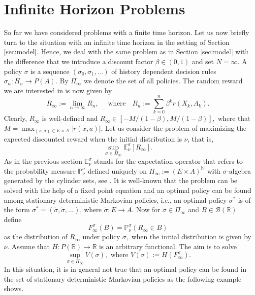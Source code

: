 \documentclass[reqno, 12pt]{amsart}%
\newcommand{\R}{\mathbb{R}} %
\newcommand{\N}{\mathbb{N}} %
\newcommand{\PP}{\mathbb{P}}
\newcommand{\EE}{\mathbb{E}}
\theoremstyle{definition}
\numberwithin{equation}{section} \numberwithin{theorem}{section}
\begin{document}
\section{Infinite Horizon Problems}\label{sec:infi}
So far we have considered problems with a finite time horizon. Let us now briefly turn to the situation with an infinite time horizon in the setting of Section 
\ref{sec:model}. 
Hence, we deal with the same problem as in Section \ref{sec:model} with the difference that we introduce a discount factor $\beta\in(0,1)$
and set $N=\infty.$ A policy $\sigma$ is a sequence 
$(\sigma_0,\sigma_1,\ldots)$ of history dependent decision rules 
$\sigma_n : H_n \to P(A)$. By $\Pi_\infty$ we denote the set of all policies.  The random reward we are interested in is now given by
$$ R_\infty := \lim_{n\to\infty} R_n,\quad \mbox{ where}\quad R_n :=\sum_{k=0}^n \beta^k r(X_k,A_k).$$
Clearly, $R_\infty$ is well-defined and $R_\infty\in[-M/(1-\beta),M/(1-\beta)],$  where  that $M=\max_{(x,a)\in E\times A}|r(x,a)|$.
Let us consider the problem of 
maximizing the expected discounted reward when the 
initial distribution is $\nu$, that is, 
$$ \sup_{\sigma\in \Pi_\infty} \EE_{\nu}^\sigma[R_\infty].$$
As in the previous section $\EE_{\nu}^\sigma$ stands
for the expectation operator that refers to the probability measure $\PP_{\nu}^\sigma$ defined uniquely on $H_\infty:=(E\times A)^{\N}$ with 
$\sigma$-algebra generated by the cylinder sets,
see \cite{puterman2014markov}.
It is well-known that the problem 
can be solved with the help of a fixed point equation and an optimal policy can be found among stationary deterministic Markovian policies, i.e., an optimal policy 
$\sigma^*$ is of the form  $\sigma^*=(\tilde \sigma, \tilde\sigma,\ldots)$, 
where $\tilde \sigma: E\to A.$ Now for $\sigma\in \Pi_\infty$ and 
$B\in \mathcal{B}(\R)$ define 
$$F^\sigma_\infty(B)= \PP_\nu^\sigma (R_\infty \in B)$$
as the distribution of $R_\infty$ under policy $\sigma,$  when the initial distribution is given by $\nu$.
Assume that $H:P(\R)\to\R$ is an arbitrary functional.
  The aim is to solve
\begin{equation}\label{eq:prob_infty}
     \sup_{\sigma\in \Pi_\infty} V(\sigma), \mbox{ where } V(\sigma) :=H(F_\infty^\sigma).
\end{equation} 
In this situation, it is in general not 
true that an optimal policy can be found in 
the set of stationary deterministic 
Markovian policies as the following example 
shows. 
\end{document}
